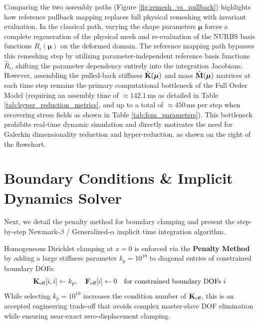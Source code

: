 Comparing the two assembly paths (Figure \ref{fig:remesh_vs_pullback}) highlights how reference pullback mapping replaces full physical remeshing with invariant evaluation. In the classical path, varying the shape parameters $\boldsymbol{\mu}$ forces a complete regeneration of the physical mesh and re-evaluation of the NURBS basis functions $R_i(\boldsymbol{\mu})$ on the deformed domain. The reference mapping path bypasses this remeshing step by utilizing parameter-independent reference basis functions $\hat{R}_i$, shifting the parameter dependency entirely into the integration Jacobians. However, assembling the pulled-back stiffness $\hat{\mathbf{K}}(\boldsymbol{\mu})$ and mass $\hat{\mathbf{M}}(\boldsymbol{\mu})$ matrices at each time step remains the primary computational bottleneck of the Full Order Model (requiring an assembly time of $\approx 142.1\,\text{ms}$ as detailed in Table \ref{tab:hyper_reduction_metrics}, and up to a total of $\approx 450\,\text{ms}$ per step when recovering stress fields as shown in Table \ref{tab:fom_parameters}). This bottleneck prohibits real-time dynamic simulation and directly motivates the need for Galerkin dimensionality reduction and hyper-reduction, as shown on the right of the flowchart.


\section{Boundary Conditions \& Implicit Dynamics Solver}

Next, we detail the penalty method for boundary clamping and present the step-by-step Newmark-$\beta$ / Generalized-$\alpha$ implicit time integration algorithm.

Homogeneous Dirichlet clamping at $x=0$ is enforced via the \textbf{Penalty Method} by adding a large stiffness parameter $k_p = 10^{10}$ to diagonal entries of constrained boundary DOFs:
\begin{equation}
    \mathbf{K}_{\text{eff}}[i, i] \gets k_p, \quad \mathbf{F}_{\text{eff}}[i] \gets 0 \quad \text{for constrained boundary DOFs } i
\end{equation}
While selecting $k_p = 10^{10}$ increases the condition number of $\mathbf{K}_{\text{eff}}$, this is an accepted engineering trade-off that avoids complex master-slave DOF elimination while ensuring near-exact zero-displacement clamping.

